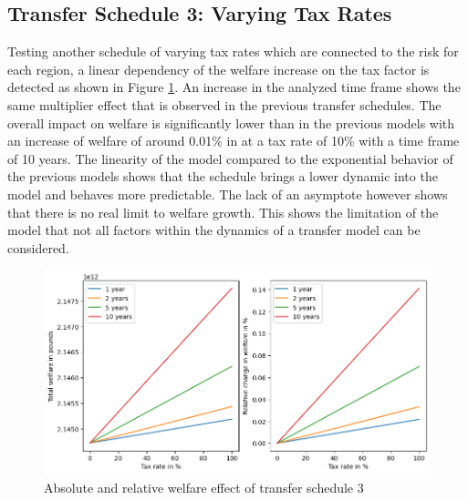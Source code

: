 \documentclass[10pt,a4paper]{article}
\begin{document}
\subsection{Transfer Schedule 3: Varying Tax Rates}
Testing another schedule of varying tax rates which are connected to the risk for each region, a linear dependency of the welfare increase on the tax factor is detected as shown in Figure \ref{fig:sche3}. An increase in the analyzed time frame shows the same multiplier effect that is observed in the previous transfer schedules. The overall impact on welfare is significantly lower than in the previous models with an increase of welfare of around 0.01\% in at a tax rate of 10\% with a time frame of 10 years.
The linearity of the model compared to the exponential behavior of the previous models shows that the schedule brings a lower dynamic into the model and behaves more predictable. The lack of an asymptote however shows that there is no real limit to welfare growth. This shows the limitation of the model that not all factors within the dynamics of a transfer model can be considered.

\begin{figure}[H]
    \centering
    \includegraphics[width=\textwidth]{Report/Schedule_3_graphics.png}
    \caption{Absolute and relative welfare effect of transfer schedule 3}
    \label{fig:sche3}
\end{figure}
\end{document}
